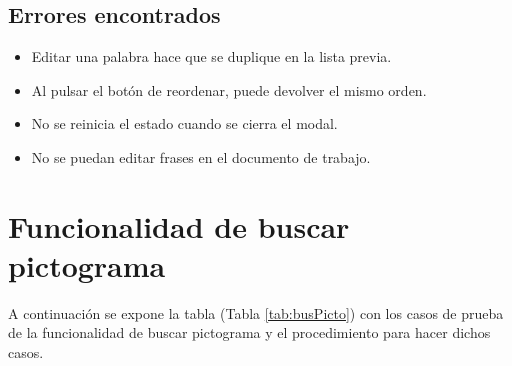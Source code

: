 \subsection{Errores encontrados}
\label{errores:v/f}
\begin{itemize}
    \item Editar una palabra hace que se duplique en la lista previa.
    \item Al pulsar el botón de reordenar, puede devolver el mismo orden.
    \item No se reinicia el estado cuando se cierra el modal.
    \item No se puedan editar frases en el documento de trabajo.
\end{itemize}

\section{Funcionalidad de buscar pictograma}
\label{planPruebas:busPicto}
A continuación se expone la tabla (Tabla \ref{tab:busPicto}) con los casos de prueba de la funcionalidad de buscar pictograma y el procedimiento para hacer dichos casos.

\begin{table}[H]
    \caption{Casos de prueba de la funcionalidad de buscar pictograma.}
    \label{tab:busPicto}
\end{table}

